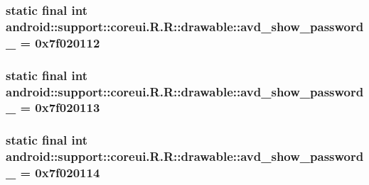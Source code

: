 \hypertarget{classandroid_1_1support_1_1coreui_1_1_r_1_1drawable_dd57192d32ceca69579192ef0aa48af1}{
\subsubsection[{avd\_\-show\_\-password\_\-1}]{\setlength{\rightskip}{0pt plus 5cm}static final int android::support::coreui.R.R::drawable::avd\_\-show\_\-password\_ = 0x7f020112}}
\label{classandroid_1_1support_1_1coreui_1_1_r_1_1drawable_dd57192d32ceca69579192ef0aa48af1}


\hypertarget{classandroid_1_1support_1_1coreui_1_1_r_1_1drawable_ef67853bfbee19e264ea1dbef646ccf9}{
\subsubsection[{avd\_\-show\_\-password\_\-2}]{\setlength{\rightskip}{0pt plus 5cm}static final int android::support::coreui.R.R::drawable::avd\_\-show\_\-password\_ = 0x7f020113}}
\label{classandroid_1_1support_1_1coreui_1_1_r_1_1drawable_ef67853bfbee19e264ea1dbef646ccf9}


\hypertarget{classandroid_1_1support_1_1coreui_1_1_r_1_1drawable_3339a3466d92271223fec65fcf30c964}{
\subsubsection[{avd\_\-show\_\-password\_\-3}]{\setlength{\rightskip}{0pt plus 5cm}static final int android::support::coreui.R.R::drawable::avd\_\-show\_\-password\_ = 0x7f020114}}
\label{classandroid_1_1support_1_1coreui_1_1_r_1_1drawable_3339a3466d92271223fec65fcf30c964}


